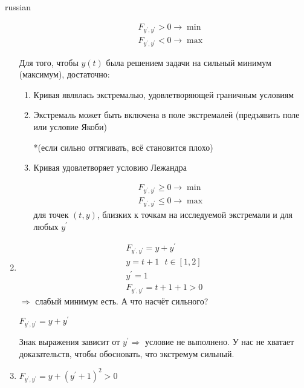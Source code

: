 \documentclass{article}
\begin{document}
\begin{otherlanguage*}{russian}
\begin{enumerate}
\begin{enumerate}
\begin{align*}
F_{y^{'}, y^{'}} > 0 \rightarrow \min \\ 
F_{y^{'}, y^{'}} < 0 \rightarrow \max 
\end{align*}
\end{enumerate} 
Для того, чтобы $ y(t) $ была решением задачи на сильный минимум (максимум), достаточно: 
\begin{enumerate}
\item Кривая являлась экстремалью, удовлетворяющей граничным условиям 
\item Экстремаль может быть включена в поле экстремалей (предъявить поле или условие Якоби) 

*(если сильно оттягивать, всё становится плохо) 
\item Кривая удовлетворяет условию Лежандра 

\begin{align*}
F_{y^{'}, y^{'}} \ge 0 \rightarrow \min \\ 
F_{y^{'}, y^{'}} \le 0 \rightarrow \max 
\end{align*}
для точек $ (t, y) $, близких к точкам на исследуемой экстремали и для любых $ y ^{'} $ 	
\end{enumerate}
\item 

\begin{align*}
F_{y^{'}, y^{'}} = y + y^{'} \\
y = t + 1 \,\,\,\, t \in [1, 2] \\
y^{'} = 1 \\
F_{y^{'}, y^{'}} = t +1 + 1 > 0 
\end{align*}
$ \Rightarrow $ слабый минимум есть. А что насчёт сильного? 

$ F_{y^{'}, y^{'}} = y + y ^{'} $ 

Знак выражения зависит от $ y ^{'} \Rightarrow $ условие не выполнено. У нас не хватает доказательств, чтобы обосновать, что экстремум сильный. 

\item $ F_{y^{'}, y^{'}} = y + (y^{'} + 1) ^ 2 > 0 $  

\end{enumerate}
\end{otherlanguage*}
\end{document}
